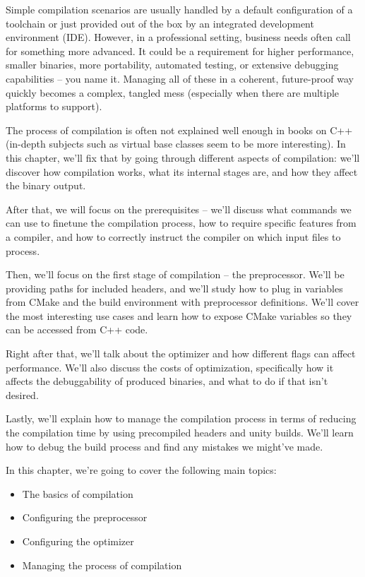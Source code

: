 Simple compilation scenarios are usually handled by a default configuration of a toolchain or just provided out of the box by an integrated development environment (IDE). However, in a professional setting, business needs often call for something more advanced. It could be a requirement for higher performance, smaller binaries, more portability, automated testing, or extensive debugging capabilities – you name it. Managing all of these in a coherent, future-proof way quickly becomes a complex, tangled mess (especially when there are multiple platforms to support).

The process of compilation is often not explained well enough in books on C++ (in-depth subjects such as virtual base classes seem to be more interesting). In this chapter, we’ll fix that by going through different aspects of compilation: we’ll discover how compilation works, what its internal stages are, and how they affect the binary output.

After that, we will focus on the prerequisites – we’ll discuss what commands we can use to finetune the compilation process, how to require specific features from a compiler, and how to correctly instruct the compiler on which input files to process.

Then, we’ll focus on the first stage of compilation – the preprocessor. We’ll be providing paths for included headers, and we’ll study how to plug in variables from CMake and the build environment with preprocessor definitions. We’ll cover the most interesting use cases and learn how to expose CMake variables so they can be accessed from C++ code.

Right after that, we’ll talk about the optimizer and how different flags can affect performance. We’ll also discuss the costs of optimization, specifically how it affects the debuggability of produced binaries, and what to do if that isn’t desired.

Lastly, we’ll explain how to manage the compilation process in terms of reducing the compilation time by using precompiled headers and unity builds. We’ll learn how to debug the build process and find any mistakes we might’ve made.

In this chapter, we’re going to cover the following main topics:

\begin{itemize}
\item
The basics of compilation

\item
Configuring the preprocessor

\item
Configuring the optimizer

\item
Managing the process of compilation
\end{itemize}






